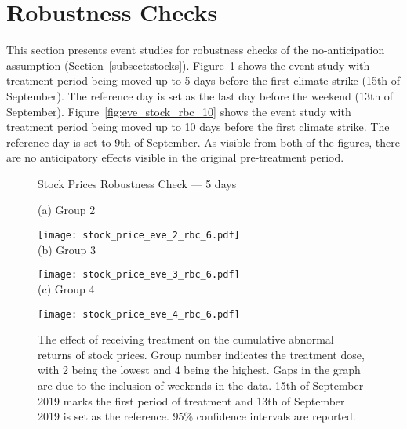 \documentclass[12pt]{article}
\begin{document}

\renewcommand\thefigure{\thesection.\arabic{figure}}
\section{Robustness Checks}\label{app:robustness}
\setcounter{figure}{0} 

This section presents event studies for robustness checks of the no-anticipation assumption (Section~\ref{subsect:stocks}). Figure~\ref{fig:eve_stock_rbc_6} shows the event study with treatment period being moved up to 5 days before the first climate strike (15th of September). The reference day is set as the last day before the weekend (13th of September). Figure~\ref{fig:eve_stock_rbc_10} shows the event study with treatment period being moved up to 10 days before the first climate strike. The reference day is set to 9th of September. As visible from both of the figures, there are no anticipatory effects visible in the original pre-treatment period.

\begin{figure}
    \caption{Stock Prices Robustness Check --- 5 days}\label{fig:eve_stock_rbc_6}
    \centering
    
    (a) Group 2
    
    \texttt{[image: stock\_price\_eve\_2\_rbc\_6.pdf]} \\
    
    (b) Group 3
    
    \texttt{[image: stock\_price\_eve\_3\_rbc\_6.pdf]} \\
    
    (c) Group 4
    
    \texttt{[image: stock\_price\_eve\_4\_rbc\_6.pdf]}
    
    \captionsetup{font=footnotesize}
    \caption*{The effect of receiving treatment on the cumulative abnormal returns of stock prices. Group number indicates the treatment dose, with 2 being the lowest and 4 being the highest. Gaps in the graph are due to the inclusion of weekends in the data. 15th of September 2019 marks the first period of treatment and 13th of September 2019 is set as the reference. 95\% confidence intervals are reported.}
\end{figure}
\end{document}
